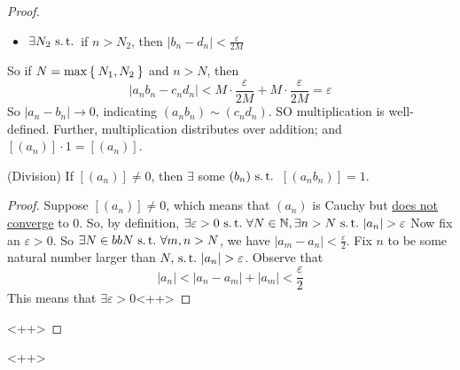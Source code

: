 \documentclass[12pt]{amsart}
\newcommand{\bbN}{\mathbb{N}}
\newcommand{\suchthat}{\operatorname{\thinspace s.t. \thinspace}}
\theoremstyle{plain}
\theoremstyle{remark}
\theoremstyle{definition}
\begin{document}
\begin{enumerate}
\begin{proof}
\begin{itemize}[-]
				\item $\exists N_2 \suchthat$ if $n > N_2$, then $|b_n - d_n| < \frac{\varepsilon}{2M}$
			\end{itemize}
			So if $N = \max\Set{N_1, N_2}$ and $n > N$, then 
			\begin{equation*}
				|a_n b_n - c_n d_n| < M\cdot \frac{\varepsilon}{2M} + M \cdot \frac{\varepsilon}{2M} = \varepsilon
			\end{equation*}
			So $|a_n - b_n| \rightarrow 0$, indicating $(a_n b_n) \sim (c_n d_n)$.
			\newline
			SO multiplication is well-defined.
			\newline
			Further, multiplication distributes  over addition; and $[(a_n)] \cdot 1 = [(a_n)]$.
		\item (Division)
			If $[(a_n)] \neq 0$, then $\exists$ some $(b_n) \suchthat$ $[(a_n b_n)] = 1$.
			\begin{proof}
				Suppose $[(a_n)] \neq 0$, which means that $(a_n)$ is Cauchy but \ul{does not converge} to $0$. So, by definition, $\exists \varepsilon > 0 \suchthat \forall N \in \bbN, \exists n > N \suchthat |a_n| > \varepsilon$
				Now fix an $\varepsilon > 0$. So $\exists N \in bbN \suchthat \forall m,n > N$, we have $|a_m - a_n| < \frac{\varepsilon}{2}$.
				\newline
				Fix $n$ to be some natural number larger than $N, \suchthat |a_n| > \varepsilon$. Observe that 
				\begin{equation*}
					|a_n| < |a_n - a_m| + |a_m| < \frac{\varepsilon}{2}
				\end{equation*}
				This means that $\exists \varepsilon > 0$<++>
			\end{proof}<++>
		\end{proof}
\end{enumerate}<++>
\end{document}
